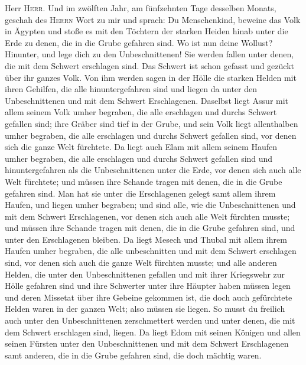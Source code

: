 Herr \textsc{Herr}.  Und im zwölften Jahr, am fünfzehnten
Tage desselben Monats, geschah des \textsc{Herrn} Wort zu mir und
sprach:  Du Menschenkind, beweine das Volk in Ägypten und
stoße es mit den Töchtern der starken Heiden hinab unter die Erde zu
denen, die in die Grube gefahren sind.  Wo ist nun deine
Wollust? Hinunter, und lege dich zu den Unbeschnittenen! 
Sie werden fallen unter denen, die mit dem Schwert erschlagen sind. Das
Schwert ist schon gefasst und gezückt über ihr ganzes Volk.
 Von ihm werden sagen in der Hölle die starken Helden mit
ihren Gehilfen, die alle hinuntergefahren sind und liegen da unter den
Unbeschnittenen und mit dem Schwert Erschlagenen. 
Daselbst liegt Assur mit allem seinem Volk umher begraben, die alle
erschlagen und durchs Schwert gefallen sind;  ihre Gräber
sind tief in der Grube, und sein Volk liegt allenthalben umher begraben,
die alle erschlagen und durchs Schwert gefallen sind, vor denen sich die
ganze Welt fürchtete.  Da liegt auch Elam mit allem
seinem Haufen umher begraben, die alle erschlagen und durchs Schwert
gefallen sind und hinuntergefahren als die Unbeschnittenen unter die
Erde, vor denen sich auch alle Welt fürchtete; und müssen ihre Schande
tragen mit denen, die in die Grube gefahren sind.  Man
hat sie unter die Erschlagenen gelegt samt allem ihrem Haufen, und
liegen umher begraben; und sind alle, wie die Unbeschnittenen und mit
dem Schwert Erschlagenen, vor denen sich auch alle Welt fürchten musste;
und müssen ihre Schande tragen mit denen, die in die Grube gefahren
sind, und unter den Erschlagenen bleiben.  Da liegt
Mesech und Thubal mit allem ihrem Haufen umher begraben, die alle
unbeschnitten und mit dem Schwert erschlagen sind, vor denen sich auch
die ganze Welt fürchten musste;  und alle anderen Helden,
die unter den Unbeschnittenen gefallen und mit ihrer Kriegswehr zur
Hölle gefahren sind und ihre Schwerter unter ihre Häupter haben müssen
legen und deren Missetat über ihre Gebeine gekommen ist, die doch auch
gefürchtete Helden waren in der ganzen Welt; also müssen sie liegen.
 So musst du freilich auch unter den Unbeschnittenen
zerschmettert werden und unter denen, die mit dem Schwert erschlagen
sind, liegen.  Da liegt Edom mit seinen Königen und allen
seinen Fürsten unter den Unbeschnittenen und mit dem Schwert
Erschlagenen samt anderen, die in die Grube gefahren sind, die doch
mächtig waren.

